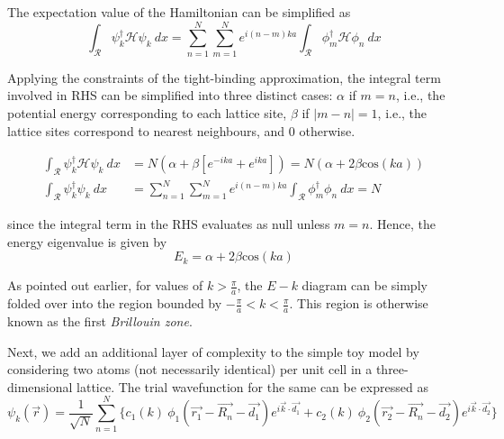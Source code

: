 The expectation value of the Hamiltonian can be simplified as
\begin{equation*}
    \int_{\mathcal{R}} \psi_{k}^{\dagger}\mathcal{H}\psi_{k} \: dx = \sum_{n=1}^{N} \sum_{m=1}^{N}e^{i(n-m)ka} \int_{\mathcal{R}} \phi_{m}^{\dagger}\mathcal{H}\phi_{n} \: dx
\end{equation*}

Applying the constraints of the tight-binding approximation, the integral term involved in RHS can be simplified into three distinct cases: $\alpha$ if $m = n$, i.e., the potential energy corresponding to each lattice site, $\beta$ if $|m-n| =1$, i.e., the lattice sites correspond to nearest neighbours, and $0$ otherwise.

\begin{equation*}
   \begin{aligned}
   	  \int_{\mathcal{R}} \psi_{k}^{\dagger}\mathcal{H}\psi_{k} \: dx &= N(\alpha + \beta[e^{-ika}+e^{ika}]) = N(\alpha + 2\beta \text{cos}(ka)) \\
   	  \int_{\mathcal{R}} \psi_{k}^{\dagger}\psi_{k} \: dx &= \sum_{n=1}^{N} \sum_{m=1}^{N}e^{i(n-m)ka} \int_{\mathcal{R}} \phi_{m}^{\dagger}\phi_{n}\: dx = N
   \end{aligned}
\end{equation*}

since the integral term in the RHS evaluates as null unless $m = n$. Hence, the energy eigenvalue is given by
\begin{equation}
    E_{k} = \alpha + 2\beta \text{cos}(ka)
\end{equation}

As pointed out earlier, for values of $k > \frac{\pi}{a}$, the $E-k$ diagram can be simply folded over into the region bounded by $-\frac{\pi}{a} < k < \frac{\pi}{a}$. This region is otherwise known as the first \textit{Brillouin zone}. \par

Next, we add an additional layer of complexity to the simple toy model by considering two atoms (not necessarily identical) per unit cell in a three-dimensional lattice. The trial wavefunction for the same can be expressed as
\begin{equation*} 
    \psi_{k}(\vec{r}) = \frac{1}{\sqrt{N}}\sum_{n=1}^{N}\{c_{1}(k) \: \phi_{1}(\vec{r_{1}}-\vec{R_{n}}-\vec{d_{1}})e^{i\vec{k}\cdot \vec{d_{1}}} + c_{2}(k)\: \phi_{2}(\vec{r_{2}}-\vec{R_{n}}-\vec{d_{2}})e^{i\vec{k}\cdot \vec{d_{2}}}\}
\end{equation*}

